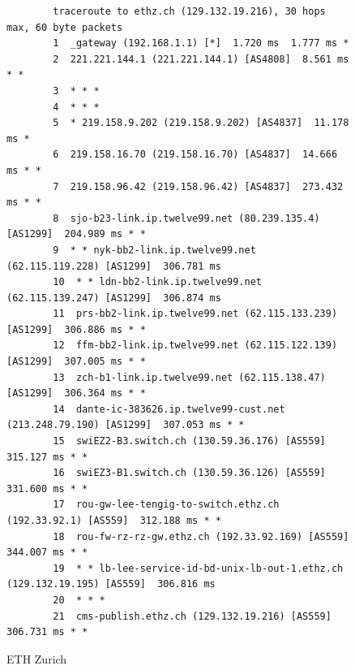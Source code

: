 \documentclass{cshwk}
\begin{document}
\begin{figure}[H]
    \footnotesize
    \begin{verbatim}
        traceroute to ethz.ch (129.132.19.216), 30 hops max, 60 byte packets
        1  _gateway (192.168.1.1) [*]  1.720 ms  1.777 ms *
        2  221.221.144.1 (221.221.144.1) [AS4808]  8.561 ms * *
        3  * * *
        4  * * *
        5  * 219.158.9.202 (219.158.9.202) [AS4837]  11.178 ms *
        6  219.158.16.70 (219.158.16.70) [AS4837]  14.666 ms * *
        7  219.158.96.42 (219.158.96.42) [AS4837]  273.432 ms * *
        8  sjo-b23-link.ip.twelve99.net (80.239.135.4) [AS1299]  204.989 ms * *
        9  * * nyk-bb2-link.ip.twelve99.net (62.115.119.228) [AS1299]  306.781 ms
        10  * * ldn-bb2-link.ip.twelve99.net (62.115.139.247) [AS1299]  306.874 ms
        11  prs-bb2-link.ip.twelve99.net (62.115.133.239) [AS1299]  306.886 ms * *
        12  ffm-bb2-link.ip.twelve99.net (62.115.122.139) [AS1299]  307.005 ms * *
        13  zch-b1-link.ip.twelve99.net (62.115.138.47) [AS1299]  306.364 ms * *
        14  dante-ic-383626.ip.twelve99-cust.net (213.248.79.190) [AS1299]  307.053 ms * *
        15  swiEZ2-B3.switch.ch (130.59.36.176) [AS559]  315.127 ms * *
        16  swiEZ3-B1.switch.ch (130.59.36.126) [AS559]  331.600 ms * *
        17  rou-gw-lee-tengig-to-switch.ethz.ch (192.33.92.1) [AS559]  312.188 ms * *
        18  rou-fw-rz-rz-gw.ethz.ch (192.33.92.169) [AS559]  344.007 ms * *
        19  * * lb-lee-service-id-bd-unix-lb-out-1.ethz.ch (129.132.19.195) [AS559]  306.816 ms
        20  * * *
        21  cms-publish.ethz.ch (129.132.19.216) [AS559]  306.731 ms * *
    \end{verbatim}
    \caption{ETH Zurich}
    \label{fig:traceroute-ethz}
\end{figure}
\end{document}

